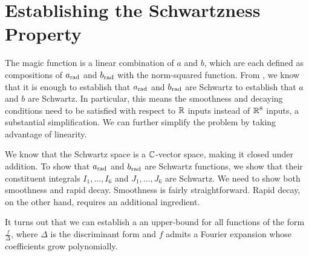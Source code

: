 \section{Establishing the Schwartzness Property}
\label{Ch4:Sec:Schwartzness}

The magic function is a linear combination of $a$ and $b$, which are each defined as compositions of $a_{\operatorname{rad}}$ and $b_{\operatorname{rad}}$ with the norm-squared function. From , we know that it is enough to establish that $a_{\operatorname{rad}}$ and $b_{\operatorname{rad}}$ are Schwartz to establish that $a$ and $b$ are Schwartz. In particular, this means the smoothness and decaying conditions need to be satisfied with respect to $\mathbb{R}$ inputs instead of $\mathbb{R}^8$ inputs, a substantial simplification. We can further simplify the problem by taking advantage of linearity.

We know that the Schwartz space is a $\mathbb{C}$-vector space, making it closed under addition. To show that $a_{\operatorname{rad}}$ and $b_{\operatorname{rad}}$ are Schwartz functions, we show that their constituent integrals $I_1, \ldots, I_6$ and $J_1, \ldots, J_6$ are Schwartz. We need to show both smoothness and rapid decay. Smoothness is fairly straightforward. Rapid decay, on the other hand, requires an additional ingredient.

It turns out that we can establish a an upper-bound for all functions of the form $\frac{f}{\Delta}$, where $\Delta$ is the discriminant form and $f$ admits a Fourier expansion whose coefficients grow polynomially.

